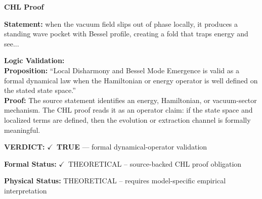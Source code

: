 \vspace{0.45em}
\noindent\textbf{CHL Proof}\par
\textbf{Statement:} when the vacuum field slips out of phase locally, it produces a standing wave pocket
with Bessel profile, creating a fold that traps energy and see...

\textbf{Logic Validation:}\\
\textbf{Proposition:} ``Local Disharmony and Bessel Mode Emergence is valid as a formal dynamical law when the
Hamiltonian or energy operator is well defined on the stated state space.''\\
\textbf{Proof:} The source statement identifies an energy, Hamiltonian, or vacuum-sector mechanism. The
CHL proof reads it as an operator claim: if the state space and localized terms are
defined, then the evolution or extraction channel is formally meaningful.

\textbf{VERDICT:} \ensuremath{\checkmark}\ \textbf{TRUE} --- formal dynamical-operator validation

\textbf{Formal Status:} \ensuremath{\checkmark}\ THEORETICAL -- source-backed CHL proof obligation

\textbf{Physical Status:} THEORETICAL -- requires model-specific empirical interpretation
\par\vspace{0.45em}
\par
\ifTZPDarkEdition
{}
\fi
\endgroup
\endgroup
